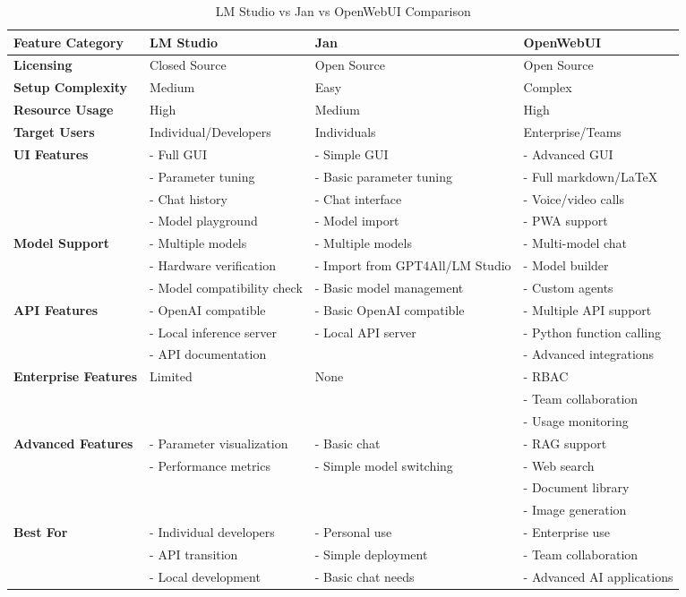 \begin{table*}[h!]
\centering
\caption{LM Studio vs Jan vs OpenWebUI Comparison}
\label{tab:feature-comparison-ui}
\begin{tabular}{llll}
\toprule
Feature Category & LM Studio & Jan & OpenWebUI \\
\midrule
\textbf{Licensing} & Closed Source & Open Source & Open Source \\
\textbf{Setup Complexity} & Medium & Easy & Complex \\
\textbf{Resource Usage} & High & Medium & High \\
\textbf{Target Users} & Individual/Developers & Individuals & Enterprise/Teams \\
\textbf{UI Features} & - Full GUI & - Simple GUI & - Advanced GUI \\
& - Parameter tuning & - Basic parameter tuning & - Full markdown/LaTeX \\
& - Chat history & - Chat interface & - Voice/video calls \\
& - Model playground & - Model import & - PWA support \\
\textbf{Model Support} & - Multiple models & - Multiple models & - Multi-model chat \\
& - Hardware verification & - Import from GPT4All/LM Studio & - Model builder \\
& - Model compatibility check & - Basic model management & - Custom agents \\
\textbf{API Features} & - OpenAI compatible & - Basic OpenAI compatible & - Multiple API support \\
& - Local inference server & - Local API server & - Python function calling \\
& - API documentation & & - Advanced integrations \\
\textbf{Enterprise Features} & Limited & None & - RBAC \\
& & & - Team collaboration \\
& & & - Usage monitoring \\
\textbf{Advanced Features} & - Parameter visualization & - Basic chat & - RAG support \\
& - Performance metrics & - Simple model switching & - Web search \\
& & & - Document library \\
& & & - Image generation \\
\textbf{Best For} & - Individual developers & - Personal use & - Enterprise use \\
& - API transition & - Simple deployment & - Team collaboration \\
& - Local development & - Basic chat needs & - Advanced AI applications \\
\bottomrule
\end{tabular}
\end{table*}


